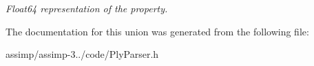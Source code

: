 \begin{DoxyCompactItemize}
\begin{DoxyCompactList}\small\item\em Float64 representation of the property. \end{DoxyCompactList}\end{DoxyCompactItemize}


The documentation for this union was generated from the following file\+:\begin{DoxyCompactItemize}
\item 
assimp/assimp-\/3../code/Ply\+Parser.\+h\end{DoxyCompactItemize}
